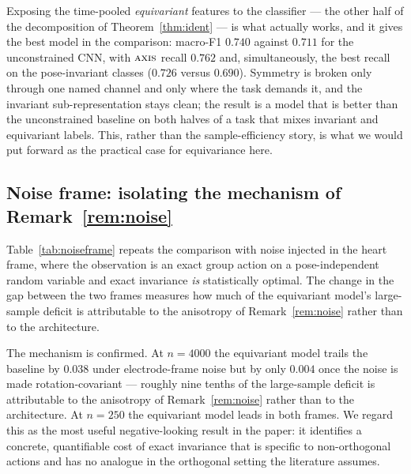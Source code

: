 \documentclass[11pt]{article}
\theoremstyle{definition}
\begin{document}
Exposing the time-pooled \emph{equivariant} features to the classifier --- the other
half of the decomposition of Theorem~\ref{thm:ident} --- is what actually works, and it
gives the best model in the comparison: macro-F1 $0.740$ against $0.711$ for the
unconstrained CNN, with $\textsc{axis}$ recall $0.762$ and, simultaneously, the best
recall on the pose-invariant classes ($0.726$ versus $0.690$). Symmetry is broken only
through one named channel and only where the task demands it, and the invariant
sub-representation stays clean; the result is a model that is better than the
unconstrained baseline on both halves of a task that mixes invariant and equivariant
labels. This, rather than the sample-efficiency story, is what we would put forward as
the practical case for equivariance here.

\subsection{Noise frame: isolating the mechanism of Remark~\ref{rem:noise}}\label{sec:noiseframe}

Table~\ref{tab:noiseframe} repeats the comparison with noise injected in the heart
frame, where the observation is an exact group action on a pose-independent random
variable and exact invariance \emph{is} statistically optimal. The change in the gap
between the two frames measures how much of the equivariant model's large-sample
deficit is attributable to the anisotropy of Remark~\ref{rem:noise} rather than to the
architecture.

\begin{table}[t]\centering
\caption{Test macro-F1 with noise in the electrode frame (realistic) versus the heart
frame (where exact invariance is optimal).}
\label{tab:noiseframe}

\end{table}

The mechanism is confirmed. At $n = 4000$ the equivariant model trails the baseline by
$0.038$ under electrode-frame noise but by only $0.004$ once the noise is made
rotation-covariant --- roughly nine tenths of the large-sample deficit is attributable
to the anisotropy of Remark~\ref{rem:noise} rather than to the architecture. At
$n = 250$ the equivariant model leads in both frames. We regard this as the most
useful negative-looking result in the paper: it identifies a concrete, quantifiable
cost of exact invariance that is specific to non-orthogonal actions and has no
analogue in the orthogonal setting the literature assumes.
\end{document}
